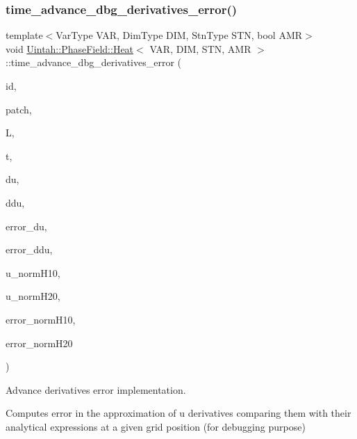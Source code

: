 \subsubsection{\texorpdfstring{time\+\_\+advance\+\_\+dbg\+\_\+derivatives\+\_\+error()}{time\_advance\_dbg\_derivatives\_error()}}
{\footnotesize\ttfamily template$<$Var\+Type V\+AR, Dim\+Type D\+IM, Stn\+Type S\+TN, bool A\+MR$>$ \\
void \hyperlink{classUintah_1_1PhaseField_1_1Heat}{Uintah\+::\+Phase\+Field\+::\+Heat}$<$ V\+AR, D\+IM, S\+TN, A\+MR $>$\+::time\+\_\+advance\+\_\+dbg\+\_\+derivatives\+\_\+error (\begin{DoxyParamCaption}\item[{const Int\+Vector \&}]{id,  }\item[{const Patch $\ast$}]{patch,  }\item[{const double \&}]{L,  }\item[{const double \&}]{t,  }\item[{\hyperlink{namespaceUintah_1_1PhaseField_a59210a1e28eba254d428762c92ddeabb}{View}$<$ \hyperlink{structUintah_1_1PhaseField_1_1VectorField}{Vector\+Field}$<$ const double, D\+IM $>$ $>$ \&}]{du,  }\item[{\hyperlink{namespaceUintah_1_1PhaseField_a59210a1e28eba254d428762c92ddeabb}{View}$<$ \hyperlink{structUintah_1_1PhaseField_1_1VectorField}{Vector\+Field}$<$ const double, D\+IM $>$ $>$ \&}]{ddu,  }\item[{\hyperlink{namespaceUintah_1_1PhaseField_a59210a1e28eba254d428762c92ddeabb}{View}$<$ \hyperlink{structUintah_1_1PhaseField_1_1VectorField}{Vector\+Field}$<$ double, D\+IM $>$ $>$ \&}]{error\+\_\+du,  }\item[{\hyperlink{namespaceUintah_1_1PhaseField_a59210a1e28eba254d428762c92ddeabb}{View}$<$ \hyperlink{structUintah_1_1PhaseField_1_1VectorField}{Vector\+Field}$<$ double, D\+IM $>$ $>$ \&}]{error\+\_\+ddu,  }\item[{double \&}]{u\+\_\+norm\+H10,  }\item[{double \&}]{u\+\_\+norm\+H20,  }\item[{double \&}]{error\+\_\+norm\+H10,  }\item[{double \&}]{error\+\_\+norm\+H20 }\end{DoxyParamCaption})\hspace{0.3cm}{\ttfamily [protected]}}



Advance derivatives error implementation. 

Computes error in the approximation of u derivatives comparing them with their analytical expressions at a given grid position (for debugging purpose)


